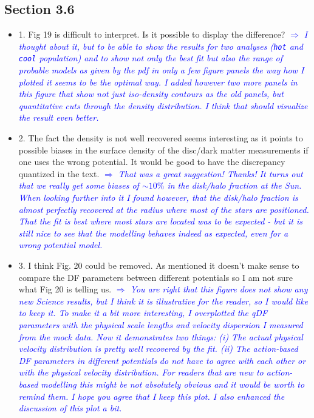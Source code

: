 \documentclass[10pt,a4paper]{article}
\newcommand{\Comment}[1]{\textsl{\textcolor{Blue}{$\Longrightarrow$ {#1}}}}
\begin{document}
\subsection{Section 3.6}
\begin{itemize}
\item 1. Fig 19 is difficult to interpret. Is it possible to display the difference? \Comment{I thought about it, but to be able to show the results for two analyses (\texttt{hot} and \texttt{cool} population) and to show not only the best fit but also the range of probable models as given by the pdf in only a few figure panels the way how I plotted it seems to be the optimal way. I added however two more panels in this figure that show not just iso-density contours as the old panels, but quantitative cuts through the density distribution. I think that should visualize the result even better.} 
\item 2. The fact the density is not well recovered seems interesting as it points to possible biases in the surface density of the disc/dark matter measurements if one uses the wrong potential. It would be good to have the discrepancy quantized in the text. \Comment{That was a great suggestion! Thanks! It turns out that we really get some biases of $\sim10\%$ in the disk/halo fraction at the Sun. When looking further into it I found however, that the disk/halo fraction is almost perfectly recovered at the radius where most of the stars are positioned. That the fit is best where most stars are located was to be expected - but it is still nice to see that the modelling behaves indeed as expected, even for a wrong potential model.}
\item 3. I think Fig. 20 could be removed. As mentioned it doesn't make sense to compare the DF parameters between different potentials so I am not sure what Fig 20 is telling us. \Comment{You are right that this figure does not show any new Science results, but I think it is illustrative for the reader, so I would like to keep it. To make it a bit more interesting, I overplotted the qDF parameters with the physical scale lengths and velocity dispersion I measured from the mock data. Now it demonstrates two things: (i) The actual physical velocity distribution is pretty well recovered by the fit. (ii) The action-based DF parameters in different potentials do not have to agree with each other or with the physical velocity distribution. For readers that are new to action-based modelling this might be not absolutely obvious and it would be worth to remind them. I hope you agree that I keep this plot. I also enhanced the discussion of this plot a bit.}

\end{itemize}
\end{document}
